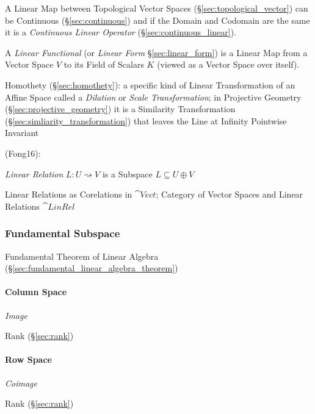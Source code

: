 A Linear Map between Topological Vector Spaces
(\S\ref{sec:topological_vector}) can be Continuous
(\S\ref{sec:continuous}) and if the Domain and Codomain are the same
it is a \emph{Continuous Linear Operator} (\S\ref{sec:continuous_linear}).

A \emph{Linear Functional} (or \emph{Linear Form} \S\ref{sec:linear_form}) is a
Linear Map from a Vector Space $V$ to its Field of Scalars $K$ (viewed as a
Vector Space over itself).

Homothety (\S\ref{sec:homothety}): a specific kind of Linear Transformation of
an Affine Space called a \emph{Dilation} or \emph{Scale Transformation}; in
Projective Geometry (\S\ref{sec:projective_geometry}) it is a Similarity
Transformation (\S\ref{sec:simliarity_transformation}) that leaves the Line at
Infinity Pointwise Invariant

(Fong16):


\emph{Linear Relation} $L : U \rightsquigarrow V$ is a Subspace $L
\subseteq U \oplus V$

Linear Relations as Corelations in $\cat{Vect}$; Category of Vector
Spaces and Linear Relations $\cat{LinRel}$



\subsubsection{Fundamental Subspace}\label{sec:fundamental_subspace}

\fist Fundamental Theorem of Linear Algebra
(\S\ref{sec:fundamental_linear_algebra_theorem})


\paragraph{Column Space}\label{sec:column_space}\hfill

\emph{Image}

Rank (\S\ref{sec:rank})



\paragraph{Row Space}\label{sec:row_space}\hfill

\emph{Coimage}

Rank (\S\ref{sec:rank})



